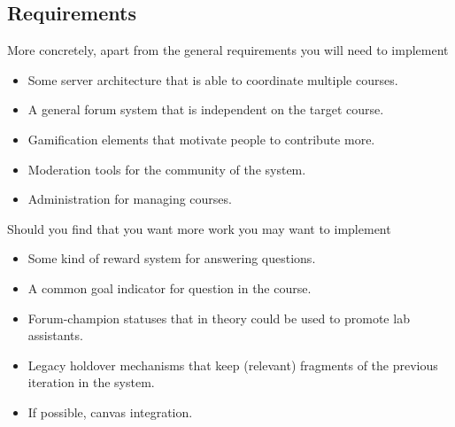 \begin{refsection}
\subsection*{Requirements}
More concretely, apart from the general requirements you will need to implement
\begin{itemize}
    \item Some server architecture that is able to coordinate multiple courses.
    \item A general forum system that is independent on the target course.
    \item Gamification elements that motivate people to contribute more.
    \item Moderation tools for the community of the system.
    \item Administration for managing courses.
\end{itemize}
Should you find that you want more work you may want to implement
\begin{itemize}
    \item Some kind of reward system for answering questions.
    \item A common goal indicator for question in the course.
    \item Forum-champion statuses that in theory could be used to promote lab assistants.
    \item Legacy holdover mechanisms that keep (relevant) fragments of the previous iteration in the system.
    \item If possible, canvas integration.
\end{itemize}

\end{refsection}
